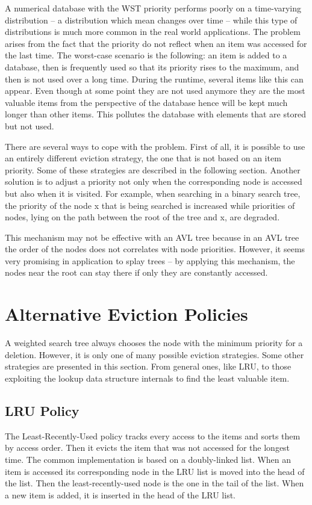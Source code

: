 A numerical database with the WST priority performs poorly on a time-varying distribution – a distribution which mean changes over time – while this type of distributions is much more common in the real world applications. The problem arises from the fact that the priority do not reflect when an item was accessed for the last time. The worst-case scenario is the following: an item is added to a database, then is frequently used so that its priority rises to the maximum, and then is not used over a long time. During the runtime, several items like this can appear. Even though at some point they are not used anymore they are the most valuable items from the perspective of the database hence will be kept much longer than other items. This pollutes the database with elements that are stored but not used.

There are several ways to cope with the problem. First of all, it is possible to use an entirely different eviction strategy, the one that is not based on an item priority. Some of these strategies are described in the following section. Another solution is to adjust a priority not only when the corresponding node is accessed but also when it is visited. For example, when searching in a binary search tree, the priority of the node x that is being searched is increased while priorities of nodes, lying on the path between the root of the tree and x, are degraded.

This mechanism may not be effective with an AVL tree because in an AVL tree the order of the nodes does not correlates with node priorities. However, it seems very promising in application to splay trees – by applying this mechanism, the nodes near the root can stay there if only they are constantly accessed.

\section{Alternative Eviction Policies}
A weighted search tree always chooses the node with the minimum priority for a deletion. However, it is only one of many possible eviction strategies. Some other strategies are presented in this section. From general ones, like LRU, to those exploiting the lookup data structure internals to find the least valuable item.

\subsection{LRU Policy}
The Least-Recently-Used policy tracks every access to the items and sorts them by access order. Then it evicts the item that was not accessed for the longest time. The common implementation is based on a doubly-linked list. When an item is accessed its corresponding node in the LRU list is moved into the head of the list. Then the least-recently-used node is the one in the tail of the list. When a new item is added, it is inserted in the head of the LRU list.


